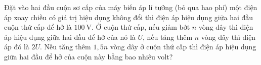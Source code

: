 \begin{ex}
	Đặt vào hai đầu cuộn sơ cấp của máy biến áp lí tưởng (bỏ qua hao phí) một điện áp xoay chiều có giá trị hiệu dụng không đổi thì điện áp hiệu dụng giữa hai đầu cuộn thứ cấp để hở là $\SI{100}{\volt}$. Ở cuộn thứ cấp, nếu giảm bớt $n$ vòng dây thì điện áp hiệu dụng giữa hai đầu để hở của nó là $U$, nếu tăng thêm $n$ vòng dây thì điện áp đó là $2U$. Nếu tăng thêm $1,5n$ vòng dây ở cuộn thứ cấp thì điện áp hiệu dụng giữa hai đầu để hở của cuộn này bằng bao nhiêu volt?
\end{ex}

